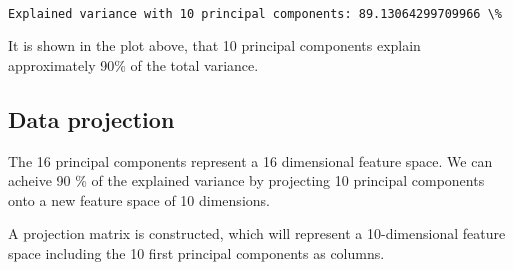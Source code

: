 \documentclass[11pt]{article}
\begin{document}
    \begin{center}
    \end{center}
    { \hspace*{\fill} \\}
    
    \begin{Verbatim}[commandchars=\\\{\}]
Explained variance with 10 principal components: 89.13064299709966 \%

    \end{Verbatim}

    It is shown in the plot above, that 10 principal components explain
approximately 90\% of the total variance.

    \subsection{Data projection}\label{data-projection}

The 16 principal components represent a 16 dimensional feature space. We
can acheive 90 \% of the explained variance by projecting 10 principal
components onto a new feature space of 10 dimensions.

A projection matrix is constructed, which will represent a
10-dimensional feature space including the 10 first principal components
as columns.
\end{document}
